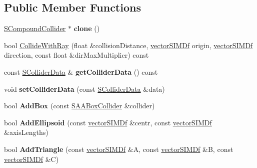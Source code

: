 \subsection*{Public Member Functions}
\begin{DoxyCompactItemize}
\item 
\hyperlink{classirr_1_1core_1_1SCompoundCollider}{S\+Compound\+Collider} $\ast$ {\bfseries clone} ()\hypertarget{classirr_1_1core_1_1SCompoundCollider_ae58e984d64c2517bf081ce523ad7e438}{}\label{classirr_1_1core_1_1SCompoundCollider_ae58e984d64c2517bf081ce523ad7e438}

\item 
bool \hyperlink{classirr_1_1core_1_1SCompoundCollider_aa57435ad16542fe1e20f6d5c27bcb47d}{Collide\+With\+Ray} (float \&collision\+Distance, \hyperlink{classirr_1_1core_1_1vectorSIMDf}{vector\+S\+I\+M\+Df} origin, \hyperlink{classirr_1_1core_1_1vectorSIMDf}{vector\+S\+I\+M\+Df} direction, const float \&dir\+Max\+Multiplier) const 
\item 
const \hyperlink{classirr_1_1core_1_1SColliderData}{S\+Collider\+Data} \& {\bfseries get\+Collider\+Data} () const \hypertarget{classirr_1_1core_1_1SCompoundCollider_ac359d39b17c11362217faf834c1c169f}{}\label{classirr_1_1core_1_1SCompoundCollider_ac359d39b17c11362217faf834c1c169f}

\item 
void {\bfseries set\+Collider\+Data} (const \hyperlink{classirr_1_1core_1_1SColliderData}{S\+Collider\+Data} \&data)\hypertarget{classirr_1_1core_1_1SCompoundCollider_ac304eb54adba1c6425840a8dad34ae64}{}\label{classirr_1_1core_1_1SCompoundCollider_ac304eb54adba1c6425840a8dad34ae64}

\item 
bool {\bfseries Add\+Box} (const \hyperlink{classirr_1_1core_1_1SAABoxCollider}{S\+A\+A\+Box\+Collider} \&collider)\hypertarget{classirr_1_1core_1_1SCompoundCollider_ac204523573128872a2f5330ce59a8bed}{}\label{classirr_1_1core_1_1SCompoundCollider_ac204523573128872a2f5330ce59a8bed}

\item 
bool {\bfseries Add\+Ellipsoid} (const \hyperlink{classirr_1_1core_1_1vectorSIMDf}{vector\+S\+I\+M\+Df} \&centr, const \hyperlink{classirr_1_1core_1_1vectorSIMDf}{vector\+S\+I\+M\+Df} \&axis\+Lengths)\hypertarget{classirr_1_1core_1_1SCompoundCollider_af46af946ad5654e6e0802800faa1a64d}{}\label{classirr_1_1core_1_1SCompoundCollider_af46af946ad5654e6e0802800faa1a64d}

\item 
bool {\bfseries Add\+Triangle} (const \hyperlink{classirr_1_1core_1_1vectorSIMDf}{vector\+S\+I\+M\+Df} \&A, const \hyperlink{classirr_1_1core_1_1vectorSIMDf}{vector\+S\+I\+M\+Df} \&B, const \hyperlink{classirr_1_1core_1_1vectorSIMDf}{vector\+S\+I\+M\+Df} \&C)\hypertarget{classirr_1_1core_1_1SCompoundCollider_a987a41930039826f6c8431d0016df92c}{}\label{classirr_1_1core_1_1SCompoundCollider_a987a41930039826f6c8431d0016df92c}


\end{DoxyCompactItemize}
